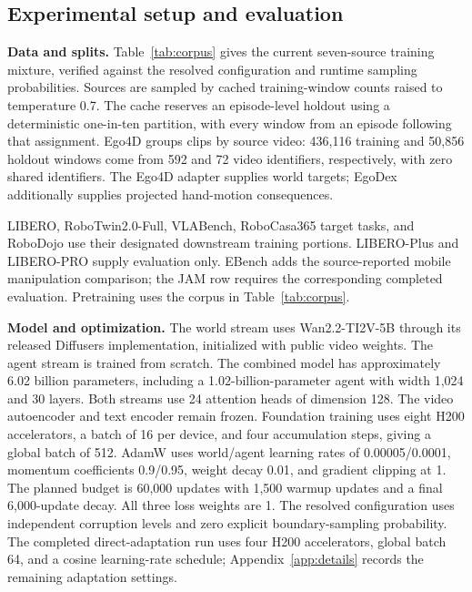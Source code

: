 \subsection{Experimental setup and evaluation}
\label{app:setup}
\textbf{Data and splits.}
Table~\ref{tab:corpus} gives the current seven-source training mixture, verified against the resolved
configuration and runtime sampling probabilities. Sources are sampled by cached training-window
counts raised to temperature 0.7. The cache reserves an episode-level holdout using a deterministic
one-in-ten partition, with every window from an episode following that assignment. Ego4D groups
clips by source video: 436,116 training and 50,856 holdout windows come from 592 and 72 video
identifiers, respectively, with zero shared identifiers. The Ego4D adapter supplies world targets;
EgoDex additionally supplies projected hand-motion consequences.


LIBERO, RoboTwin2.0-Full, VLABench, RoboCasa365 target tasks, and RoboDojo use their designated
downstream training portions. LIBERO-Plus and LIBERO-PRO supply evaluation only. EBench adds the
source-reported mobile manipulation comparison; the JAM row requires the corresponding completed
evaluation. Pretraining uses the corpus in Table~\ref{tab:corpus}.

\textbf{Model and optimization.}
The world stream uses Wan2.2-TI2V-5B through its released Diffusers implementation, initialized with
public video weights. The agent stream is trained from scratch. The combined model has approximately
6.02 billion parameters, including a 1.02-billion-parameter agent with width 1,024 and 30 layers.
Both streams use 24 attention heads of dimension 128. The video autoencoder and text encoder remain
frozen. Foundation training uses eight H200 accelerators, a batch of 16 per device, and four
accumulation steps, giving a global batch of 512. AdamW uses world/agent learning rates of
0.00005/0.0001, momentum coefficients 0.9/0.95, weight decay 0.01, and gradient clipping at 1. The
planned budget is 60,000 updates with 1,500 warmup updates and a final 6,000-update decay. All three
loss weights are 1. The resolved configuration uses independent corruption levels and zero explicit
boundary-sampling probability. The completed direct-adaptation run uses four H200 accelerators,
global batch 64, and a cosine learning-rate schedule; Appendix~\ref{app:details} records the remaining adaptation settings.

